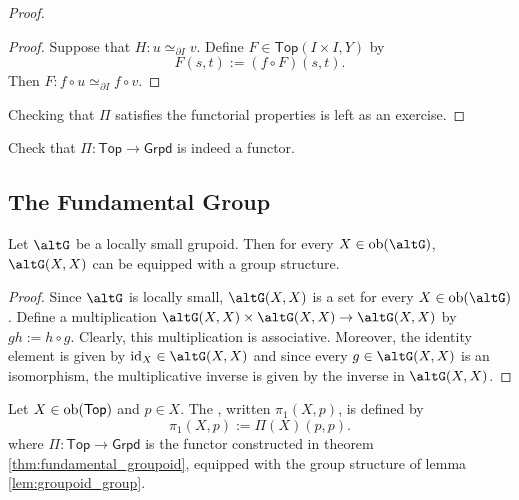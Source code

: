 \begin{proof}
\begin{enumerate}[label = \textit{Step \arabic*:},wide = 0pt, itemsep = 1.5ex]
\begin{itemize}[leftmargin = *]
					\begin{proof}
						Suppose that $H : u \simeq_{\partial I} v$. Define $F \in \mathsf{Top}(I \times I,Y)$ by
						\begin{equation*}
							F(s,t) := (f \circ F)(s,t).
						\end{equation*}
						Then $F : f \circ u \simeq_{\partial I} f \circ v$.
					\end{proof}
			\end{itemize}
	\end{enumerate}
	Checking that $\Pi$ satisfies the functorial properties is left as an exercise.
\end{proof}

\begin{exercise}
	Check that $\Pi : \mathsf{Top} \to \mathsf{Grpd}$ is indeed a functor.
\end{exercise}

\subsection*{The Fundamental Group}

\begin{lemma}
	Let $\mathcal{\altG}$ be a locally small grupoid. Then for every $X \in \ob(\mathcal{\altG})$, $\mathcal{\altG}(X,X)$ can be equipped with a group structure.
	\label{lem:groupoid_group}
\end{lemma}

\begin{proof}
	Since $\mathcal{\altG}$ is locally small, $\mathcal{\altG}(X,X)$ is a set for every $X \in \ob(\mathcal{\altG})$. Define a multiplication $\mathcal{\altG}(X,X) \times \mathcal{\altG}(X,X) \to \mathcal{\altG}(X,X)$ by $gh := h \circ g$. Clearly, this multiplication is associative. Moreover, the identity element is given by $\id_X \in \mathcal{\altG}(X,X)$ and since every $g \in \mathcal{\altG}(X,X)$ is an isomorphism, the multiplicative inverse is given by the inverse in $\mathcal{\altG}(X,X)$. 
\end{proof}

\begin{definition}
	Let $X \in \operatorname{ob}(\mathsf{Top})$ and $p \in X$. The , written $\pi_1(X,p)$, is defined by
	\begin{equation}
		\pi_1(X,p) := \Pi(X)(p,p).
	\end{equation}
	\noindent where $\Pi : \mathsf{Top} \to \mathsf{Grpd}$ is the functor constructed in theorem \ref{thm:fundamental_groupoid}, equipped with the group structure of lemma \ref{lem:groupoid_group}.
\end{definition}

